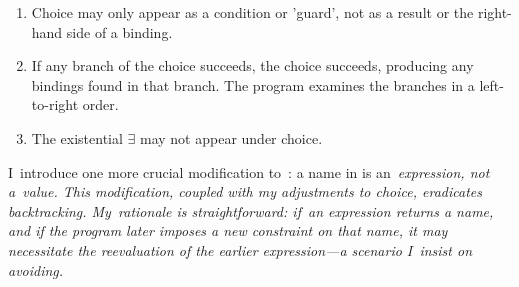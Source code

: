 \documentclass[manuscript,screen 12pt, nonacm]{acmart}
\begin{document}
        \begin{enumerate}
        \item Choice may only appear as a condition or 'guard', not as a result
        or the right-hand side of a binding.
        \item If any branch of the choice succeeds, the choice succeeds,
        producing any bindings found in that branch. The program examines the
        branches in a left-to-right order.
        \item The existential $\exists$ may not appear under choice.
        \end{enumerate}
        
        I~introduce one more crucial modification to~\VC: a name in
        \VMinus is an~\it{expression}, not a~\it{value}. This modification,
        coupled with my adjustments to choice, eradicates backtracking. My~rationale is straightforward: if~an expression returns a
        name, and if the program later imposes a new constraint on that
        name, it may necessitate the reevaluation of the earlier expression---a
        scenario I~insist on avoiding. 




\end{document}
